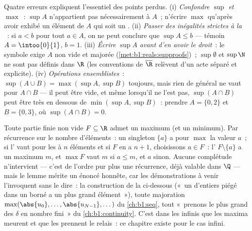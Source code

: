 \begin{remark}
Quatre erreurs expliquent l'essentiel des points perdus. (i)
\emph{Confondre $\sup$ et $\max$}~: $\sup A$ n'appartient pas
nécessairement à $A$~; n'écrire $\max$ qu'après avoir exhibé un
élément de $A$ qui soit un . (ii) \emph{Passer des
inégalités strictes à la }~: si $a < b$ pour
tout $a \in A$, on ne peut conclure que $\sup A \leq b$ ---
témoin $A = \intoo{0}{1}$, $b = 1$. (iii) \emph{Écrire $\sup A$
avant d'en avoir le droit}~: le symbole exige $A$ non vide et
majorée (\cref{met:b1:reals:supproofs})~; $\sup \emptyset$
et $\sup \N$ ne sont pas définis dans $\R$ (les conventions de
$\overline\R$ relèvent d'un acte séparé et explicite). (iv)
\emph{Opérations ensemblistes}~: $\sup(A \cup B) = \max(\sup A,
\sup B)$ toujours, mais rien de général ne vaut pour $A \cap B$
--- il peut être vide, et même lorsqu'il ne l'est pas,
$\sup(A \cap B)$ peut être très en dessous de
$\min(\sup A, \sup B)$~: prendre $A = \{0, 2\}$ et $B = \{0, 3\}$,
où $\sup(A \cap B) = 0$.
\end{remark}

\begin{example}\label{ex:b1:reals:finitemax}
Toute partie finie non vide $F \subseteq \R$ admet un maximum (et
un minimum). Par récurrence sur le nombre d'éléments~: un
singleton $\{a\}$ a pour $\max$ la valeur $a$~; si l'
vaut pour les  à $n$ éléments et si $F$ en a $n + 1$,
choisissons $a \in F$~: l' $F \setminus \{a\}$ a un
maximum $m$, et $\max F$ vaut $m$ si $a \leq m$, et $a$ sinon.
Aucune complétude n'intervient --- c'est de l'ordre pur plus une
récurrence, déjà valable dans $\Q$ --- mais le lemme mérite un
énoncé honnête, car les démonstrations à venir l'invoquent sans le
dire~: la construction de la  ci-dessous
(«~un  d'entiers piégé dans un  borné a un plus
grand élément~»), toute majoration $\max(\abs{u_0}, \dots,
\abs{u_{N-1}}, \dots)$ du \cref{ch:b1:seq}, tout «~prenons le plus
grand des $\delta$ en nombre fini~» du \cref{ch:b1:continuity}.
C'est dans les  infinis que les maxima meurent et que les
 prennent le relais~: ce chapitre existe pour le
cas infini.
\end{example}

